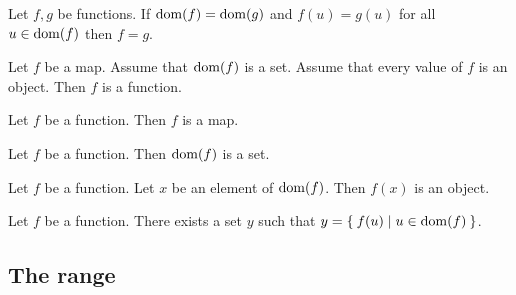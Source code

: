 \documentclass[../../set-theory.ftl.tex]{subfiles}
\begin{document}
  \begin{forthel}
    \begin{axiom}\label{SetTheory_02_01_200419}
      Let $f,g$ be functions.
      If $\operatorname{dom}(f) = \operatorname{dom}(g)$ and $f(u) = g(u)$ for all $u \in \operatorname{dom}(f)$ then $f = g$.
    \end{axiom}



    \begin{axiom}
      Let $f$ be a map.
      Assume that $\operatorname{dom}(f)$ is a set.
      Assume that every value of $f$ is an object.
      Then $f$ is a function.
    \end{axiom}

    \begin{axiom}
      Let $f$ be a function.
      Then $f$ is a map.
    \end{axiom}

    \begin{axiom}
      Let $f$ be a function.
      Then $\operatorname{dom}(f)$ is a set.
    \end{axiom}

    \begin{axiom}
      Let $f$ be a function.
      Let $x$ be an element of $\operatorname{dom}(f)$.
      Then $f(x)$ is an object.
    \end{axiom}


    \begin{axiom}[Replacement]\label{SetTheory_02_01_297906}
      Let $f$ be a function.
      There exists a set $y$ such that $y = \Set{f(u) | u \in \operatorname{dom}(f)}$.
    \end{axiom}
  \end{forthel}


  \subsection{The range}
\end{document}
